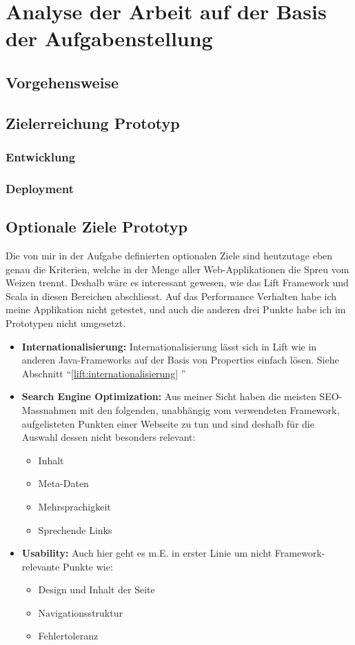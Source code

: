 
\chapter{Analyse der Arbeit auf der Basis der Aufgabenstellung}
\section{Vorgehensweise}
\section{Zielerreichung Prototyp}
\subsection{Entwicklung}
\subsection{Deployment}

\section{Optionale Ziele Prototyp}
Die von mir in der Aufgabe definierten optionalen Ziele sind heutzutage eben genau die Kriterien, welche in der Menge aller Web-Applikationen die Spreu vom Weizen trennt. Deshalb w\"are es interessant gewesen, wie das Lift Framework und Scala in diesen Bereichen abschliesst. Auf das Performance Verhalten habe ich meine Applikation nicht getestet, und auch die anderen drei Punkte habe ich im Prototypen nicht umgesetzt. 
\begin{itemize}
\item  \textbf{Internationalisierung: } Internationalisierung l\"asst sich in Lift wie in anderen Java-Frameworks auf der Basis von Properties einfach l\"osen. Siehe Abschnitt ``\ref{lift:internationalisierung} ''
\item \textbf{Search Engine Optimization: }Aus meiner Sicht haben die meisten SEO-Massnahmen mit den folgenden, unabh\"angig vom verwendeten Framework, aufgelisteten Punkten einer Webseite zu tun und sind deshalb f\"ur die Auswahl dessen nicht besonders relevant:
\begin{itemize}
\item Inhalt
\item Meta-Daten
\item Mehrsprachigkeit
\item Sprechende Links
\end{itemize}
\item \textbf{Usability: } Auch hier geht es m.E. in erster Linie um nicht Framework-relevante Punkte wie:
\begin{itemize}
\item Design und Inhalt der Seite
\item Navigationsstruktur
\item Fehlertoleranz
\end{itemize}
\end{itemize}

